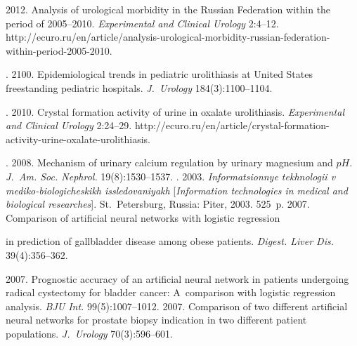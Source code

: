 \begin{multicols}{2}
{{\begin{thebibliography}{99}
2012. Analysis of urological morbidity in the Russian Federation within the period of 2005--2010.
\textit{Experimental and Clinical Urology} 2:4--12.
{\sf http://ecuro.ru/en/article/analysis-urological-morbidity-russian-federation-within-period-2005-2010}.


. 2100. Epidemiological trends in 
pediatric urolithiasis at United States freestanding pediatric hospitals. \textit{J.~Urology} 
184(3):1100--1104.

.
2010. Crystal formation activity of urine in oxalate urolithiasis.
\textit{Experimental and Clinical Urology} 2:24--29.
{\sf http://ecuro.ru/en/article/crystal-formation-activity-urine-oxalate-urolithiasis}.



. 2008. Mechanism of urinary calcium regulation by urinary magnesium and $pH$. 
\textit{J.~Am. Soc. Nephrol.} 19(8):1530--1537.
. 2003. \textit{Informatsionnye tekhnologii v 
mediko-biologicheskikh issledovaniyakh} [\textit{Information technologies in medical and 
biological researches}]. St.\ Petersburg, Russia: Piter, 2003. 525~p.
 2007. Comparison of artificial neural 
networks with logistic regression\linebreak\vspace*{-12pt}

\pagebreak

\noindent
 in prediction of gallbladder disease among obese patients. 
\textit{Digest. Liver Dis.} 39(4):356--362.



 2007. Prognostic accuracy of an 
artificial neural network in patients undergoing radical cystectomy for bladder cancer: 
A~comparison with logistic regression analysis. \textit{BJU Int.}  99(5):1007--1012.
 2007. Comparison of two different artificial 
neural networks for prostate biopsy indication in two different patient populations. 
\textit{J.~Urology}  70(3):596--601.


\end{thebibliography}}}
\end{multicols}
